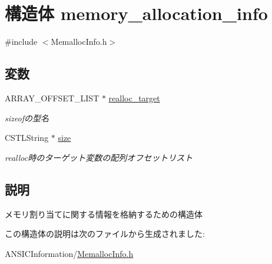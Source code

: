 \hypertarget{structmemory__allocation__info}{
\section{構造体 memory\_\-allocation\_\-info}
\label{structmemory__allocation__info}
}


{\ttfamily \#include $<$MemallocInfo.h$>$}

\subsection*{変数}
\begin{DoxyCompactItemize}
\item 
\hypertarget{structmemory__allocation__info_af1edaa8634179c3185a37cb1518e4fde}{
ARRAY\_\-OFFSET\_\-LIST $\ast$ \hyperlink{structmemory__allocation__info_af1edaa8634179c3185a37cb1518e4fde}{realloc\_\-target}}
\label{structmemory__allocation__info_af1edaa8634179c3185a37cb1518e4fde}

\begin{DoxyCompactList}\small\item\em sizeofの型名 \item\end{DoxyCompactList}\item 
\hypertarget{structmemory__allocation__info_a0ad96160d67dbf835dd7d599ece0d9b4}{
CSTLString $\ast$ \hyperlink{structmemory__allocation__info_a0ad96160d67dbf835dd7d599ece0d9b4}{size}}
\label{structmemory__allocation__info_a0ad96160d67dbf835dd7d599ece0d9b4}

\begin{DoxyCompactList}\small\item\em realloc時のターゲット変数の配列オフセットリスト \item\end{DoxyCompactList}\end{DoxyCompactItemize}


\subsection{説明}
メモリ割り当てに関する情報を格納するための構造体 

この構造体の説明は次のファイルから生成されました:\begin{DoxyCompactItemize}
\item 
ANSICInformation/\hyperlink{MemallocInfo_8h}{MemallocInfo.h}\end{DoxyCompactItemize}
